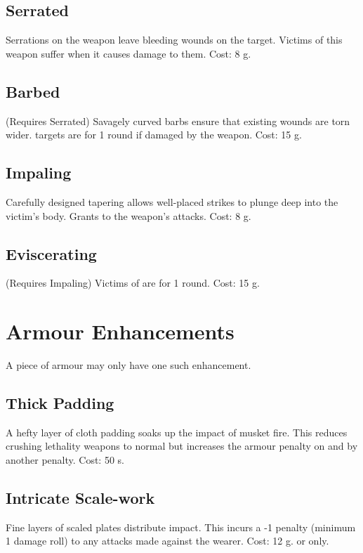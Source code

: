 \subsection{Serrated}
Serrations on the weapon leave bleeding wounds on the target. Victims of this weapon suffer  when it causes damage to them. Cost: 8 g.

\subsection{Barbed}
(Requires Serrated) Savagely curved barbs ensure that existing wounds are torn wider.  targets are  for 1 round if damaged by the weapon. Cost: 15 g.

\subsection{Impaling}
Carefully designed tapering allows well-placed strikes to plunge deep into the victim's body. Grants  to the weapon's attacks. Cost: 8 g.

\subsection{Eviscerating}
(Requires Impaling) Victims of  are  for 1 round. Cost: 15 g.


\section{Armour Enhancements}
A piece of armour may only have one such enhancement.

\subsection{Thick Padding}
A hefty layer of cloth padding soaks up the impact of musket fire. This reduces crushing lethality  weapons to normal  but increases the armour penalty on  and  by another  penalty. Cost: 50 s.

\subsection{Intricate Scale-work}
Fine layers of scaled plates distribute impact. This incurs a -1  penalty (minimum 1 damage roll) to any attacks  made against the wearer. Cost: 12 g.  or  only.

